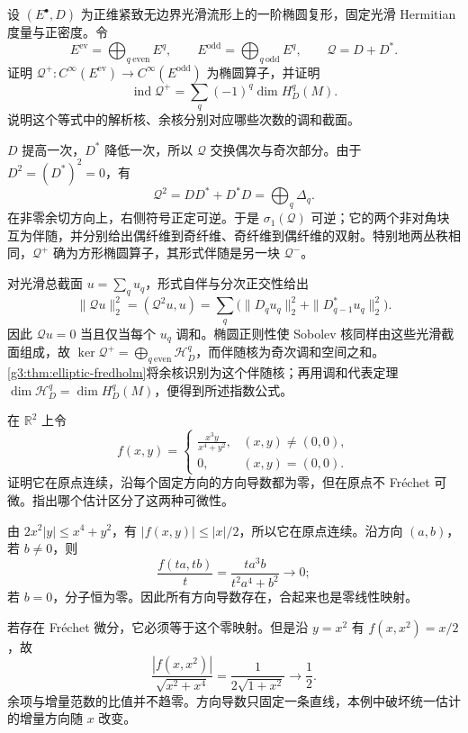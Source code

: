 \begin{exercise}\label{g3:ex:elliptic-complex-euler-index}
	设 \((E^\bullet,D)\) 为正维紧致无边界光滑流形上的一阶椭圆复形，固定光滑 Hermitian 度量与正密度。令
	\[
		E^{\mathrm{ev}}=\bigoplus_{q\ \mathrm{even}}E^q,
		\qquad E^{\mathrm{odd}}=\bigoplus_{q\ \mathrm{odd}}E^q,
		\qquad \mathcal Q=D+D^*.
	\]
	证明 \(\mathcal Q^+:C^\infty(E^{\mathrm{ev}})\to C^\infty(E^{\mathrm{odd}})\) 为椭圆算子，并证明
	\[
		\operatorname{ind}\mathcal Q^+
		=\sum_q(-1)^q\dim H_D^q(M).
	\]
	说明这个等式中的解析核、余核分别对应哪些次数的调和截面。
\end{exercise}
\begin{solution}
	\(D\) 提高一次，\(D^*\) 降低一次，所以 \(\mathcal Q\) 交换偶次与奇次部分。由于 \(D^2=(D^*)^2=0\)，有
	\[
		\mathcal Q^2=DD^*+D^*D=\bigoplus_q\Delta_q.
	\]
	在非零余切方向上，右侧符号正定可逆。于是 \(\sigma_1(\mathcal Q)\) 可逆；它的两个非对角块互为伴随，并分别给出偶纤维到奇纤维、奇纤维到偶纤维的双射。特别地两丛秩相同，\(\mathcal Q^+\) 确为方形椭圆算子，其形式伴随是另一块 \(\mathcal Q^-\)。

	对光滑总截面 \(u=\sum_qu_q\)，形式自伴与分次正交性给出
	\[
		\|\mathcal Qu\|_2^2
		=(\mathcal Q^2u,u)
		=\sum_q\bigl(\|D_qu_q\|_2^2+\|D_{q-1}^*u_q\|_2^2\bigr).
	\]
	因此 \(\mathcal Q u=0\) 当且仅当每个 \(u_q\) 调和。椭圆正则性使 Sobolev 核同样由这些光滑截面组成，故 \(\ker\mathcal Q^+=\bigoplus_{q\ \mathrm{even}}\mathcal H_D^q\)，而伴随核为奇次调和空间之和。\cref{g3:thm:elliptic-fredholm}将余核识别为这个伴随核；再用调和代表定理 \(\dim\mathcal H_D^q=\dim H_D^q(M)\)，便得到所述指数公式。
\end{solution}

\begin{exercise}\label{g3:ex:directional-not-frechet}
	在 \(\mathbb R^2\) 上令
	\[
		f(x,y)=\begin{cases}\displaystyle\frac{x^3y}{x^4+y^2},&(x,y)\ne(0,0),\\0,&(x,y)=(0,0).\end{cases}
	\]
	证明它在原点连续，沿每个固定方向的方向导数都为零，但在原点不 Fréchet 可微。指出哪个估计区分了这两种可微性。
\end{exercise}
\begin{solution}
	由 \(2x^2|y|\le x^4+y^2\)，有 \(|f(x,y)|\le|x|/2\)，所以它在原点连续。沿方向 \((a,b)\)，若 \(b\ne0\)，则
	\[
		\frac{f(ta,tb)}t=\frac{t a^3b}{t^2a^4+b^2}\longrightarrow0;
	\]
	若 \(b=0\)，分子恒为零。因此所有方向导数存在，合起来也是零线性映射。

	若存在 Fréchet 微分，它必须等于这个零映射。但是沿 \(y=x^2\) 有 \(f(x,x^2)=x/2\)，故
	\[
		\frac{|f(x,x^2)|}{\sqrt{x^2+x^4}}
		=\frac1{2\sqrt{1+x^2}}\longrightarrow\frac12.
	\]
	余项与增量范数的比值并不趋零。方向导数只固定一条直线，本例中破坏统一估计的增量方向随 \(x\) 改变。
\end{solution}

